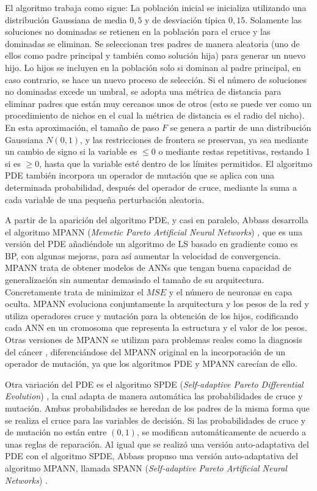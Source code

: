 El algoritmo trabaja como sigue: La población inicial se inicializa utilizando una distribución
Gaussiana de
media $0,5$ y de desviación típica $0,15$. Solamente las soluciones no dominadas se
retienen en la población para el cruce y las dominadas se eliminan. Se seleccionan tres
padres de manera aleatoria (uno de ellos como padre principal y también como solución
hija) para generar un nuevo hijo. Lo hijos se incluyen en la población solo si dominan al
padre principal, en caso contrario, se hace un nuevo proceso de selección. Si el número de
soluciones no dominadas excede un umbral, se adopta una métrica de distancia para eliminar
padres que están muy cercanos unos de otros (esto se puede ver como un procedimiento de
nichos en el cual la métrica de distancia es el radio del nicho). En esta aproximación, el
tamaño de paso $F$ se genera a partir de una distribución Gaussiana $N(0,1)$, y las
restricciones de frontera se preservan, ya sea mediante un cambio de signo si la variable
es $\leq 0$ o mediante restas repetitivas, restando 1 si es $\geq 0$, hasta que la
variable esté dentro de los límites permitidos. El algoritmo PDE también incorpora un operador de
mutación que se aplica con una determinada probabilidad, después del operador de cruce,
mediante la suma a cada variable de una pequeña perturbación aleatoria.

A partir de la aparición del algoritmo PDE, y casi en paralelo, Abbass desarrolla el algoritmo
MPANN (\textit{Memetic Pareto Artificial Neural Networks}) \cite{Abbass2001}, que es una
versión del PDE añadiéndole un algoritmo de LS basado en gradiente como es BP, con algunas
mejoras, para así aumentar la velocidad de convergencia. MPANN trata de obtener modelos
de ANNs que tengan buena capacidad de generalización sin aumentar demasiado el tamaño de
su arquitectura. Concretamente trata  de  minimizar  el $MSE$ y el número  de neuronas en  capa
oculta. MPANN evoluciona conjuntamente
la arquitectura y los pesos de la red y utiliza operadores cruce y mutación para la obtención de
los hijos, codificando cada ANN  en  un cromosoma  que  representa  la
estructura  y el  valor  de  los pesos. Otras  versiones  de MPANN  se
utilizan para problemas reales como la diagnosis del cáncer \cite{Abbass2002a},
diferenciándose del MPANN original en la incorporación de un operador de mutación, ya que
los algoritmos PDE y MPANN carecían de ello.

Otra variación del PDE es el algoritmo SPDE (\textit{Self-adaptive Pareto Differential
Evolution}) \cite{Abbass2002}, la cual adapta de manera automática las probabilidades de
cruce y mutación. Ambas probabilidades se heredan de los padres de la misma forma que se
realiza el cruce para las variables de decisión. Si las probabilidades de cruce y de mutación
no están entre $(0,1)$, se modifican automáticamente de acuerdo a unas reglas de
reparación. Al igual que se realizó una versión auto-adaptativa del PDE con el algoritmo
SPDE, Abbass propuso una versión auto-adaptativa del algoritmo MPANN, llamada SPANN
(\textit{Self-adaptive Pareto Artificial Neural Networks}) \cite{Abbass2003}.

